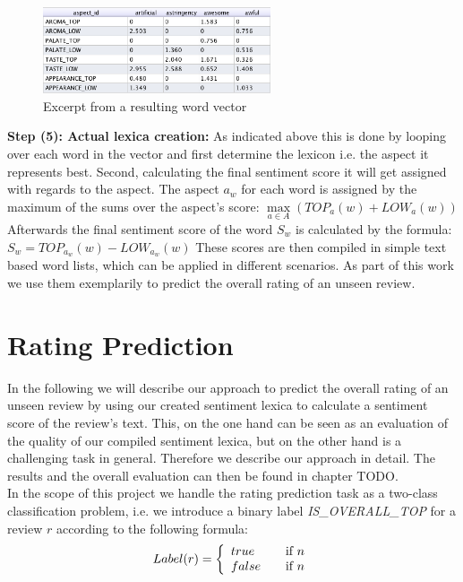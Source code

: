 \documentclass[11pt,titlepage,oneside,openany]{book}
\begin{document}
\begin{figure}[h]
  \label{fig:wordvector}
  \centering
    \includegraphics[width=0.6\textwidth]{wordvector}
    \caption{Excerpt from a resulting word vector}
\end{figure}


\textbf{Step (5): Actual lexica creation:} As indicated above this is done by looping over each word in the vector and first determine the lexicon i.e. the aspect it represents best. Second, calculating the final sentiment score it will get assigned with regards to the aspect. The aspect $a_w$ for each word is assigned by the maximum of the sums over the aspect's score: 
$\underset{a \in A}{\max} (\mbox{$TOP_a$}(w) + \mbox{$LOW_a$}(w))$ \\
Afterwards the final sentiment score of the word $S_w$ is calculated by the formula: $S_w = TOP_{a_w}(w) - LOW_{a_w}(w)$ These scores are then compiled in simple text based word lists, which can be applied in different scenarios. As part of this work we use them exemplarily to predict the overall rating of an unseen review.



\section{Rating Prediction}

In the following we will describe our approach to predict the overall rating of an unseen review by using our created sentiment lexica to calculate a sentiment score of the review's text. This, on the one hand can be seen as an evaluation of the quality of our compiled sentiment lexica, but on the other hand is a challenging task in general. Therefore we describe our approach in detail. The results and the overall evaluation can then be found in chapter TODO.\\
In the scope of this project we handle the rating prediction task as a two-class classification problem, i.e. we introduce a binary label \emph{IS\_OVERALL\_TOP} for a review $r$ according to the following formula:
\[ Label(r) = \left\{ 
  \begin{array}{l l}
    true & \quad \text{if $n$}\\
    false & \quad \text{if $n$}
  \end{array} \right.\]
\end{document}
